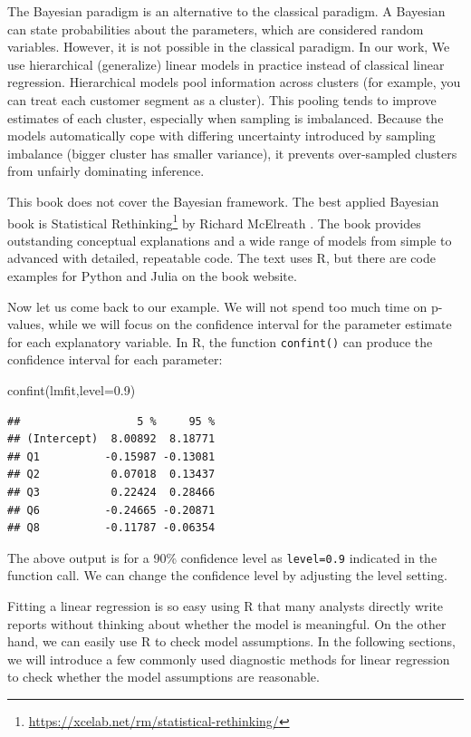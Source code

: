 \documentclass[
  12pt,
]{krantz}
\makeatletter
\newenvironment{Shaded}{\begin{snugshade}}{\end{snugshade}}
\newcommand{\AttributeTok}[1]{\textcolor[rgb]{0.61,0.61,0.61}{#1}}
\newcommand{\FloatTok}[1]{\textcolor[rgb]{0.06,0.06,0.06}{#1}}
\newcommand{\FunctionTok}[1]{\textcolor[rgb]{0,0,0}{#1}}
\newcommand{\NormalTok}[1]{#1}
\renewcommand{\href}[2]{#2\footnote{\url{#1}}}
\newenvironment{kframe}{%
\medskip{}
\setlength{\fboxsep}{.8em}
 \def\at@end@of@kframe{}%
 \ifinner\ifhmode%
  \def\at@end@of@kframe{\end{minipage}}%
  \begin{minipage}{\columnwidth}%
 \fi\fi%
 \def\FrameCommand##1{\hskip\@totalleftmargin \hskip-\fboxsep
 \colorbox{shadecolor}{##1}\hskip-\fboxsep
     \hskip-\linewidth \hskip-\@totalleftmargin \hskip\columnwidth}%
 \MakeFramed {\advance\hsize-\width
   \@totalleftmargin\z@ \linewidth\hsize
   \@setminipage}}%
 {\par\unskip\endMakeFramed%
 \at@end@of@kframe}
\renewenvironment{Shaded}{\begin{kframe}}{\end{kframe}}
\makeatother
\begin{document}
The Bayesian paradigm is an alternative to the classical paradigm. A Bayesian can state probabilities about the parameters, which are considered random variables. However, it is not possible in the classical paradigm. In our work, We use hierarchical (generalize) linear models in practice instead of classical linear regression. Hierarchical models pool information across clusters (for example, you can treat each customer segment as a cluster). This pooling tends to improve estimates of each cluster, especially when sampling is imbalanced. Because the models automatically cope with differing uncertainty introduced by sampling imbalance (bigger cluster has smaller variance), it prevents over-sampled clusters from unfairly dominating inference.

This book does not cover the Bayesian framework. The best applied Bayesian book is \href{https://xcelab.net/rm/statistical-rethinking/}{Statistical Rethinking} by Richard McElreath \citep{rethinking2020}. The book provides outstanding conceptual explanations and a wide range of models from simple to advanced with detailed, repeatable code. The text uses R, but there are code examples for Python and Julia on the book website.

Now let us come back to our example. We will not spend too much time on p-values, while we will focus on the confidence interval for the parameter estimate for each explanatory variable. In R, the function \texttt{confint()} can produce the confidence interval for each parameter:

\begin{Shaded}
\begin{Highlighting}[]
\FunctionTok{confint}\NormalTok{(lmfit,}\AttributeTok{level=}\FloatTok{0.9}\NormalTok{)}
\end{Highlighting}
\end{Shaded}

\begin{verbatim}
##                  5 %     95 %
## (Intercept)  8.00892  8.18771
## Q1          -0.15987 -0.13081
## Q2           0.07018  0.13437
## Q3           0.22424  0.28466
## Q6          -0.24665 -0.20871
## Q8          -0.11787 -0.06354
\end{verbatim}

The above output is for a 90\% confidence level as \texttt{level=0.9} indicated in the function call. We can change the confidence level by adjusting the level setting.

Fitting a linear regression is so easy using R that many analysts directly write reports without thinking about whether the model is meaningful. On the other hand, we can easily use R to check model assumptions. In the following sections, we will introduce a few commonly used diagnostic methods for linear regression to check whether the model assumptions are reasonable.
\end{document}

